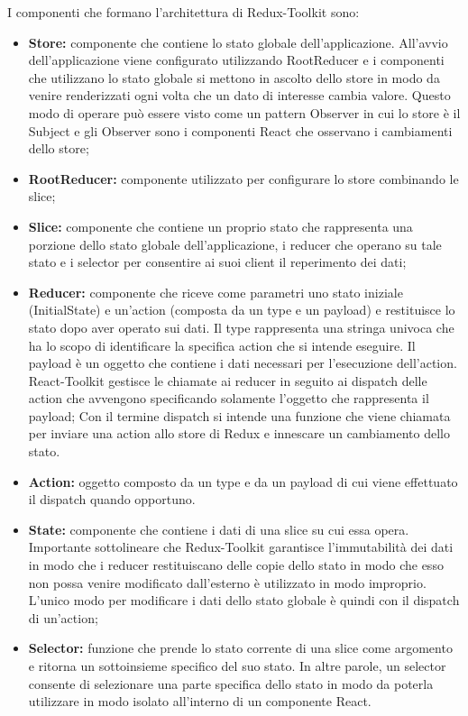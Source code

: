 I componenti che formano l'architettura di Redux-Toolkit sono:
\begin{itemize}
      \item \textbf{Store:} componente che contiene lo stato globale dell'applicazione.
            All'avvio dell'applicazione viene configurato utilizzando RootReducer e i componenti che utilizzano
            lo stato globale si mettono in ascolto dello store in modo da venire renderizzati ogni volta che un dato
            di interesse cambia valore. Questo modo di operare può essere visto come un pattern Observer in
            cui lo store è il Subject e gli Observer sono i componenti React che osservano i cambiamenti dello store;
      \item \textbf{RootReducer:} componente utilizzato per configurare lo store combinando le slice;
      \item \textbf{Slice:} componente che contiene un proprio stato che rappresenta una porzione dello stato globale
            dell'applicazione, i reducer che operano su tale stato e i selector per consentire ai suoi client il
            reperimento dei dati;
      \item \textbf{Reducer:} componente che riceve come parametri uno stato iniziale (InitialState) e un'action
            (composta da un type e un payload) e restituisce lo stato dopo aver operato sui dati.
            Il type rappresenta una stringa univoca che ha lo scopo di identificare la specifica action che si intende eseguire.
            Il payload è un oggetto che contiene i dati necessari per l'esecuzione dell'action.
            React-Toolkit gestisce le chiamate ai reducer in seguito ai dispatch delle action che avvengono
            specificando solamente l'oggetto che rappresenta il payload;
            Con il termine dispatch si intende una funzione che viene chiamata per inviare una action allo store di Redux e innescare un cambiamento dello stato.
      \item \textbf{Action:} oggetto composto da un type e da un payload di cui viene effettuato il dispatch quando
            opportuno.
      \item \textbf{State:} componente che contiene i dati di una slice su cui essa opera.
            Importante sottolineare che Redux-Toolkit garantisce l'immutabilità dei dati in modo che i reducer restituiscano delle copie dello stato in modo che esso non possa venire
            modificato dall'esterno è utilizzato in modo improprio.
            L'unico modo per modificare i dati dello stato globale è quindi con il dispatch di un'action;
      \item \textbf{Selector:} funzione che prende lo stato corrente di una slice come argomento e ritorna un sottoinsieme
            specifico del suo stato. In altre parole, un selector consente di selezionare una parte specifica
            dello stato in modo da poterla utilizzare in modo isolato all'interno di un componente React.
\end{itemize}

